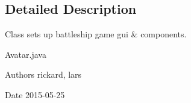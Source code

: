 \subsection{Detailed Description}
Class sets up battleship game gui \& components. 

Avatar.\+java \begin{DoxyAuthor}{Authors}
rickard, lars 
\end{DoxyAuthor}
\begin{DoxyDate}{Date}
2015-\/05-\/25 
\end{DoxyDate}
